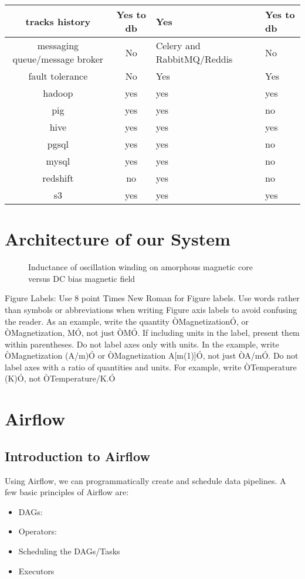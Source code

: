 \documentclass[10pt,onecolumn]{IEEEtran}
\begin{document}
{\begin{tabulary}{\linewidth}{|C|C|L|L|}
\hline
tracks history	& Yes to db	& Yes &	Yes to db \\
\hline
messaging queue\//message broker	& No & Celery and RabbitMQ\//Reddis	& No \\
\hline
fault tolerance	& No &	Yes &	Yes\\
\hline
hadoop & yes  & yes  & yes  \\
pig  & yes  & yes  & no \\
hive  & yes  & yes  & yes  \\
pgsql  & yes  & yes  & no \\
mysql & yes  & yes  & no \\
redshift & no  & yes  & no   \\
s3 & yes  & yes  & yes  \\
\hline
\end{tabulary} 
}

\section{Architecture of our System}
   \begin{figure}[thpb]
      \centering
      \caption{Inductance of oscillation winding on amorphous
       magnetic core versus DC bias magnetic field}
      \label{figurelabel}
   \end{figure}
   

Figure Labels: Use 8 point Times New Roman for Figure labels. Use words rather than symbols or abbreviations when writing Figure axis labels to avoid confusing the reader. As an example, write the quantity ÒMagnetizationÓ, or ÒMagnetization, MÓ, not just ÒMÓ. If including units in the label, present them within parentheses. Do not label axes only with units. In the example, write ÒMagnetization (A/m)Ó or ÒMagnetization {A[m(1)]}Ó, not just ÒA/mÓ. Do not label axes with a ratio of quantities and units. For example, write ÒTemperature (K)Ó, not ÒTemperature/K.Ó
\section{Airflow}
\subsection{Introduction to Airflow}
Using Airflow, we can programmatically create and schedule data pipelines. A few basic principles of Airflow are:
\begin{itemize}
\item DAGs:
\item Operators: 
\item Scheduling the DAGs/Tasks
\item Executors
\end{itemize}
\end{document}
